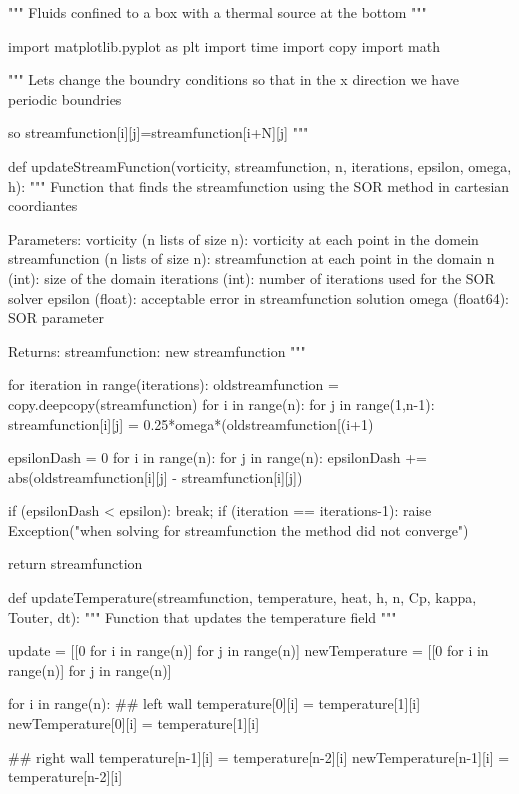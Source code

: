 """
Fluids confined to a box with a thermal source at the bottom
"""

import matplotlib.pyplot as plt
import time
import copy
import math


"""
Lets change the boundry conditions so that in the x direction we have periodic boundries

so streamfunction[i][j]=streamfunction[i+N][j]
"""


def updateStreamFunction(vorticity, streamfunction, n, iterations, epsilon, omega, h):
	"""
	Function that finds the streamfunction using the SOR method in cartesian coordiantes
	
	Parameters:
		vorticity (n lists of size n): vorticity at each point in the domein
		streamfunction (n lists of size n): streamfunction at each point in the domain
		n (int): size of the domain
		iterations (int): number of iterations used for the SOR solver
		epsilon (float): acceptable error in streamfunction solution
	 	omega (float64): SOR parameter
	 
	 Returns:
	 	streamfunction: new streamfunction
	"""
	
	for iteration in range(iterations):
		oldstreamfunction = copy.deepcopy(streamfunction)
		for i in range(n):
			for j in range(1,n-1):
				streamfunction[i][j] = 0.25*omega*(oldstreamfunction[(i+1)%
				
		epsilonDash = 0
		for i in range(n):
			for j in range(n):
				epsilonDash += abs(oldstreamfunction[i][j] - streamfunction[i][j])
				
		if (epsilonDash < epsilon):
			break;
		if (iteration == iterations-1):
			raise Exception("when solving for streamfunction the method did not converge")
		
	return streamfunction
	
	
def updateTemperature(streamfunction, temperature, heat, h, n, Cp, kappa, Touter, dt):
	"""
	Function that updates the temperature field
	"""
	
	update = [[0 for i in range(n)] for j in range(n)]
	newTemperature = [[0 for i in range(n)] for j in range(n)]
	
	
	
	for i in range(n):
		## left wall
		temperature[0][i] = temperature[1][i]
		newTemperature[0][i] = temperature[1][i]
		
		## right wall
		temperature[n-1][i] = temperature[n-2][i]
		newTemperature[n-1][i] = temperature[n-2][i]
	
